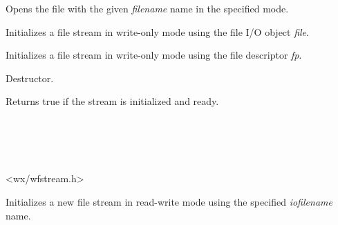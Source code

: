 Opens the file with the given {\it filename} name in the specified mode.


Initializes a file stream in write-only mode using the file I/O object {\it file}.


Initializes a file stream in write-only mode using the file descriptor {\it fp}.

\label{wxffileoutputstreamdtor}


Destructor.

\label{wxffileoutputstreamisok}


Returns true if the stream is initialized and ready.

\section{}\label{wxffilestream}


\\
\\


<wx/wfstream.h>






\label{wxffilestreamctor}


Initializes a new file stream in read-write mode using the specified 
{\it iofilename} name.


